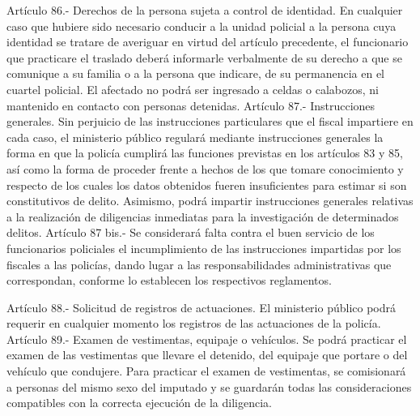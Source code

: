     Artículo 86.- Derechos de la persona sujeta a control de identidad. En cualquier caso que hubiere sido necesario conducir a la unidad policial a la persona cuya identidad se tratare de averiguar en virtud del artículo precedente, el funcionario que practicare el traslado deberá informarle verbalmente de su derecho a que se comunique a su familia o a la persona que indicare, de su permanencia en el cuartel policial. El afectado no podrá ser ingresado a celdas o calabozos, ni mantenido en contacto con personas detenidas.
    Artículo 87.- Instrucciones generales. Sin perjuicio de las instrucciones particulares que el fiscal impartiere en cada caso, el ministerio público regulará mediante instrucciones generales la forma en que la policía cumplirá las funciones previstas en los artículos 83 y 85, así como la forma de proceder frente a hechos de los que tomare conocimiento y respecto de los cuales los datos obtenidos fueren insuficientes para estimar si son constitutivos de delito. Asimismo, podrá impartir instrucciones generales relativas a la realización de diligencias inmediatas para la investigación de determinados delitos.
    Artículo 87 bis.- Se considerará falta contra el buen servicio de los funcionarios policiales el incumplimiento de las instrucciones impartidas por los fiscales a las policías, dando lugar a las responsabilidades administrativas que correspondan, conforme lo establecen los respectivos reglamentos.


    Artículo 88.- Solicitud de registros de actuaciones. El ministerio público podrá requerir en cualquier momento los registros de las actuaciones de la policía.
    Artículo 89.- Examen de vestimentas, equipaje o vehículos. Se podrá practicar el examen de las vestimentas que llevare el detenido, del equipaje que portare o del vehículo que condujere.
    Para practicar el examen de vestimentas, se comisionará a personas del mismo sexo del imputado y se guardarán todas las consideraciones compatibles con la correcta ejecución de la diligencia.

